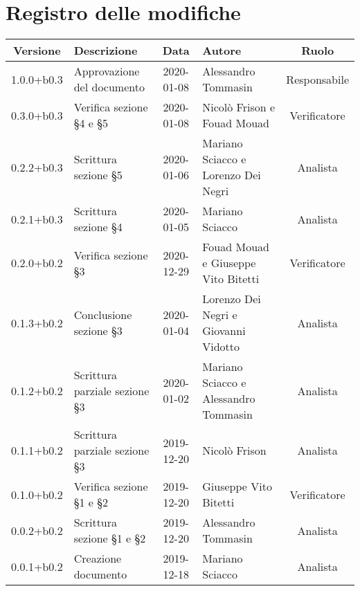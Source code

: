 \section*{Registro delle modifiche}

\begin{center}
	\begin{longtable}{|c|p{3cm}|c|p{4cm}|c|}
	\hline
	\rowcolor{lighter-grayer}
	\textbf{Versione} & \textbf{Descrizione} & \textbf{Data} & \textbf{Autore} & \textbf{Ruolo} \\
	\hline
	\endfirsthead

	1.0.0+b0.3 & Approvazione del documento & 2020-01-08 & Alessandro Tommasin & Responsabile \\
	\hline
	0.3.0+b0.3 & Verifica sezione \S4 e \S5 & 2020-01-08 & Nicolò Frison e Fouad Mouad & Verificatore \\
	\hline
	0.2.2+b0.3 & Scrittura sezione \S5 & 2020-01-06 & Mariano Sciacco e Lorenzo Dei Negri & Analista \\
	\hline
	0.2.1+b0.3 & Scrittura sezione \S4 & 2020-01-05 & Mariano Sciacco & Analista \\
	\hline
	0.2.0+b0.2 & Verifica sezione \S3 & 2020-12-29 & Fouad Mouad e Giuseppe Vito Bitetti & Verificatore \\
	\hline
	0.1.3+b0.2 & Conclusione sezione \S3 & 2020-01-04 & Lorenzo Dei Negri e Giovanni Vidotto & Analista \\
	\hline
	0.1.2+b0.2 & Scrittura parziale sezione \S3 & 2020-01-02 & Mariano Sciacco e Alessandro Tommasin & Analista \\
	\hline
	0.1.1+b0.2 & Scrittura parziale sezione \S3 & 2019-12-20 & Nicolò Frison & Analista \\
	\hline
	0.1.0+b0.2 & Verifica sezione \S1 e \S2 & 2019-12-20 & Giuseppe Vito Bitetti & Verificatore \\
	\hline
	0.0.2+b0.2 & Scrittura sezione \S1 e \S2 & 2019-12-20 & Alessandro Tommasin & Analista \\
	\hline
	0.0.1+b0.2 & Creazione documento & 2019-12-18 & Mariano Sciacco & Analista \\
	\hline

	\end{longtable}
\end{center}